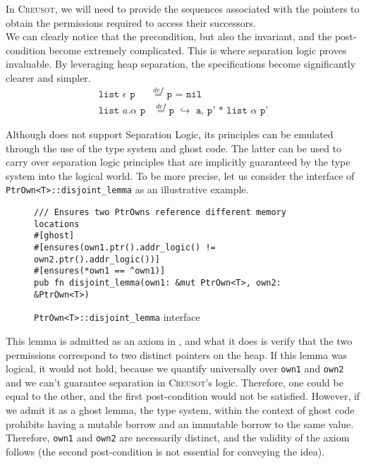 \documentclass[11pt,a4paper]{article}
\begin{document}
In \textsc{Creusot}, we will need to provide the sequences associated with the pointers to obtain the permissions required to access their successors.\\
We can clearly notice that the precondition, but also the invariant, and the post-condition become extremely complicated. This is where separation logic proves invaluable. By leveraging heap separation, the specifications become significantly clearer and simpler.\\
\begin{align*}
    \texttt{list $\epsilon$ p} & \overset{def}{=} \texttt{ p = nil}\\
    \texttt{list $a.\alpha$ p} & \overset{def}{=} \texttt{p $\hookrightarrow$ a, p' *  list $\alpha$ p'}
\end{align*}

Although \creusot{} does not support Separation Logic, its principles can be emulated through the use of the \rust{} type system and ghost code.
The latter can be used to carry over separation logic principles that are implicitly guaranteed by the \rust{} type system into the logical world. To be more precise, let us consider the interface of \texttt{PtrOwn<T>::disjoint\_lemma} as an illustrative example.

\begin{figure}[tp]
\centering
\begin{minipage}{0.9\linewidth}
\begin{verbatim}
/// Ensures two PtrOwns reference different memory locations
#[ghost]
#[ensures(own1.ptr().addr_logic() != own2.ptr().addr_logic())]
#[ensures(*own1 == ^own1)]
pub fn disjoint_lemma(own1: &mut PtrOwn<T>, own2: &PtrOwn<T>)
\end{verbatim}
\caption{\texttt{PtrOwn<T>::disjoint\_lemma} interface}
\end{minipage}
\end{figure}

This lemma is admitted as an axiom in \creusot{}, and what it does is verify that the two permissions correspond to two distinct pointers on the heap.
If this lemma was logical, it would not hold, because we quantify universally over \texttt{own1} and \texttt{own2} and we can't guarantee separation in \textsc{Creusot}'s  logic. Therefore, one could be equal to the other, and the first post-condition would not be satisfied.
However, if we admit it as a ghost lemma, the \rust{} type system, within the context of ghost code prohibits having a mutable borrow and an immutable borrow to the same value.
Therefore, \texttt{own1} and \texttt{own2} are necessarily distinct, and the validity of the axiom follows (the second post-condition is not essential for conveying the idea).
\end{document}

